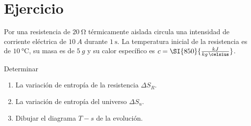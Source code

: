 \section{Ejercicio}\label{ej:Chap07Ejercicio18}
Por una resistencia de $\SI{20}{\ohm}$ térmicamente aislada circula una intensidad de corriente eléctrica de $\SI{10}{A}$ durante $\SI{1}{\second}$. La temperatura inicial de la resistencia es de $\SI{10}{\celsius}$, su masa es de $\SI{5}{g}$ y su calor específico es $c=\SI{850}{\frac{kJ}{kg\,\celsius}}$.

Determinar
\begin{enumerate}
    \item La variación de entropía de la resistencia $\Delta S_R$.
    \item La variación de entropía del universo $\Delta S_u$.
    \item Dibujar el diagrama $T-s$ de la evolución.
\end{enumerate}